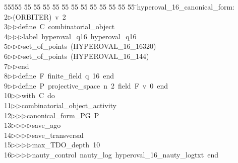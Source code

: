 %
%
\begin{tabbing}
55555 \= 55 \= 55 \= 55 \= 55 \= 55 \= 55 \= 55 \= 55 \= 55 \= 55 \= 55 \= 55 \= \>hyperoval\_16\_canonical\_form:\\[0pt]
2\>$\triangleright$\>(ORBITER)\ v\ 2\ \\[0pt]
3\>$\triangleright$\>$\triangleright$\>define\ C\ combinatorial\_object\ \\[0pt]
4\>$\triangleright$\>$\triangleright$\>$\triangleright$\>label\ hyperoval\_q16\ hyperoval\_q16\ \\[0pt]
5\>$\triangleright$\>$\triangleright$\>$\triangleright$\>set\_of\_points\ (HYPEROVAL\_16\_16320)\ \\[0pt]
6\>$\triangleright$\>$\triangleright$\>$\triangleright$\>set\_of\_points\ (HYPEROVAL\_16\_144)\ \\[0pt]
7\>$\triangleright$\>$\triangleright$\>end\ \\[0pt]
8\>$\triangleright$\>$\triangleright$\>define\ F\ finite\_field\ q\ 16\ end\ \\[0pt]
9\>$\triangleright$\>$\triangleright$\>define\ P\ projective\_space\ n\ 2\ field\ F\ v\ 0\ end\ \\[0pt]
10\>$\triangleright$\>$\triangleright$\>with\ C\ do\ \\[0pt]
11\>$\triangleright$\>$\triangleright$\>combinatorial\_object\_activity\ \\[0pt]
12\>$\triangleright$\>$\triangleright$\>$\triangleright$\>canonical\_form\_PG\ P\ \\[0pt]
13\>$\triangleright$\>$\triangleright$\>$\triangleright$\>$\triangleright$\>save\_ago\ \\[0pt]
14\>$\triangleright$\>$\triangleright$\>$\triangleright$\>$\triangleright$\>save\_transversal\ \\[0pt]
15\>$\triangleright$\>$\triangleright$\>$\triangleright$\>$\triangleright$\>max\_TDO\_depth\ 10\ \\[0pt]
16\>$\triangleright$\>$\triangleright$\>$\triangleright$\>$\triangleright$\>nauty\_control\ nauty\_log\ hyperoval\_16\_nauty\_logtxt\ end\ \\[0pt]

\end{tabbing}
